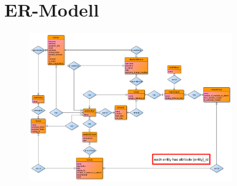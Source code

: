 
\chapter{ER-Modell}\label{fig:ermodell}
\begin{figure}[h]
	\centering 
	\includegraphics[angle={90}, width=0.78\textwidth]{img/er-model.pdf}
\end{figure}


